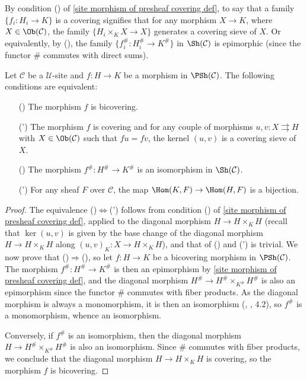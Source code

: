 By condition () of \cref{site morphism of presheaf covering def}, to say that a family $\{f_i:H_i\to K\}$ is a covering signifies that for any morphism $X\to K$, where $X\in\Ob(\mathcal{C})$, the family $\{H_i\times_KX\to X\}$ generates a covering sieve of $X$. Or equivalently, by (), the family $\{f_i^\#:H_i^\#\to K^\#\}$ in $\Sh(\mathcal{C})$ is epimorphic (since the functor $\#$ commutes with direct sums).
\begin{proposition}\label{site morphism of presheaf bicovering iff}
Let $\mathcal{C}$ be a $\mathscr{U}$-site and $f:H\to K$ be a morphism in $\PSh(\mathcal{C})$. The following conditions are equivalent:
\begin{enumerate}
\item[(\rmnum{1})] The morphism $f$ is bicovering.
\item[(\rmnum{1}')] The morphism $f$ is covering and for any couple of morphisms $u,v:X\rightrightarrows H$ with $X\in\Ob(\mathcal{C})$ such that $fu=fv$, the kernel $(u,v)$ is a covering sieve of $X$.
\item[(\rmnum{2})] The morphism $f^\#:H^\#\to K^\#$ is an isomorphism in $\Sh(\mathcal{C})$.
\item[(\rmnum{2}')] For any sheaf $F$ over $\mathcal{C}$, the map $\Hom(K,F)\to \Hom(H,F)$ is a bijection.
\end{enumerate}
\end{proposition}
\begin{proof}
The equivalence ()$\Leftrightarrow$(') follows from condition () of \cref{site morphism of presheaf covering def}, applied to the diagonal morphism $H\to H\times_KH$ (recall that $\ker(u,v)$ is given by the base change of the diagonal morphism $H\to H\times_KH$ along $(u,v)_K:X\to H\times_KH$), and that of () and (') is trivial. We now prove that ()$\Rightarrow$(), so let $f:H\to K$ be a bicovering morphism in $\PSh(\mathcal{C})$. The morphism $f^\#:H^\#\to K^\#$ is then an epimorphism by \cref{site morphism of presheaf covering def}, and the diagonal morphism $H^\#\to H^\#\times_{K^\#}H^\#$ is also an epimorphism since the functor $\#$ commutes with fiber products. As the diagonal morphism is always a monomorphism, it is then an isomorphism (\cite{SGA4-1}, , 4.2), so $f^\#$ is a monomorphism, whence an isomorphism.\par
Conversely, if $f^\#$ is an isomorphism, then the diagonal morphism $H\to H^\#\times_{K^\#}H^{\#}$ is also an isomorphism. Since $\#$ commutes with fiber products, we conclude that the diagonal morphism $H\to H\times_KH$ is covering, so the morphism $f$ is bicovering.
\end{proof}
